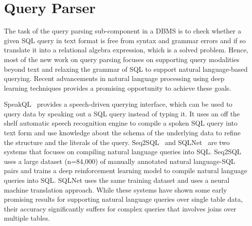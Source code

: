 \section{Query Parser}
The task of the query parsing sub-component in a DBMS is to check whether a given SQL query in text format is free from syntax and grammar errors and if so translate it into a relational algebra expression, which is a solved problem.
Hence, most of the new work on query parsing focuses on supporting query modalities beyond text and relaxing the grammar of SQL to support natural language-based querying.
Recent advancements in natural language processing using deep learning techniques provides a promising opportunity to achieve these goals.

SpeakQL~\cite{speakql} provides a speech-driven querying interface, which can be used to query data by speaking out a SQL query instead of typing it.
It uses an off the shelf automatic speech recognition engine to compile a spoken SQL query into text form and use knowledge about the schema of the underlying data to refine the structure and the literals of the query.
Seq2SQL~\cite{seq2sql} and SQLNet~\cite{sqlnet} are two systems that focuses on compiling natural language queries into SQL.
Seq2SQL uses a large dataset (n=84,000) of manually annotated natural language-SQL pairs and trains a deep reinforcement learning model to compile natural language queries into SQL.
SQLNet uses the same training dataset and uses a neural machine translation approach.
While these systems have shown some early promising results for supporting natural language queries over single table data, their accuracy significantly suffers for complex queries that involves joins over multiple tables.